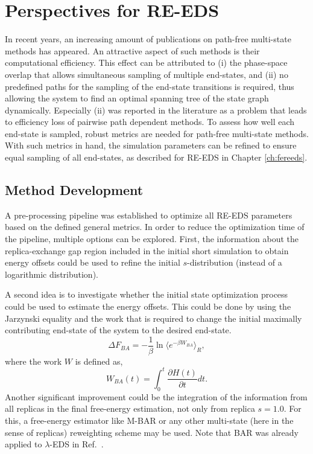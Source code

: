 
\section{Perspectives for RE-EDS}
In recent years, an increasing amount of publications on path-free multi-state methods has appeared. \cite{Donnini2011, Knight2011, Bieler2015, Sidler2016, Perthold2018} An attractive aspect of such methods is their computational efficiency. This effect can be attributed to (i) the phase-space overlap that allows simultaneous sampling of multiple end-states, and (ii) no predefined paths for the sampling of the end-state transitions is required, thus allowing the system to find an optimal spanning tree of the state graph dynamically. 
Especially (ii) was reported in the literature as a problem that leads to efficiency loss of pairwise path dependent methods.\cite{Jespers2019}
To assess how well each end-state is sampled, robust metrics are needed for path-free multi-state methods. With such metrics in hand, the simulation parameters can be refined to ensure equal sampling of all end-states, as described for RE-EDS in Chapter \ref{ch:fereeds}. 

\subsection{Method Development}
A pre-processing pipeline was established to optimize all RE-EDS parameters based on the defined general metrics. 
In order to reduce the optimization time of the pipeline, multiple options can be explored. 
First, the information about the replica-exchange gap region included in the initial short simulation to obtain energy offsets could be used to refine the initial $s$-distribution (instead of a logarithmic distribution). 

A second idea is to investigate whether the initial state optimization process could be used to estimate the energy offsets. This could be done by using the Jarzynski equality and the work that is required to change the initial maximally contributing end-state of the system to the desired end-state. \cite{Jarzynski1997,  Xiong2006} 
\begin{equation}
	\Delta F_{BA} = -\frac{1}{\beta} \ln\langle e^{-\beta W_{BA}} \rangle_R ,
\end{equation}
where the work $W$ is defined as, \cite{Xiong2006}
\begin{equation}
	W_{BA}(t)= \int_{0}^{t} \frac{\partial H(t)}{\partial t} dt .
\end{equation}
%
Another significant improvement could be the integration of the information from all replicas in the final free-energy estimation, not only from replica $s=1.0$. 
For this, a free-energy estimator like M-BAR\cite{Shirts2008} or any other multi-state (here in the sense of replicas) reweighting scheme may be used. Note that BAR\cite{Bennett1976} was already applied to $\lambda$-EDS in Ref.~.


